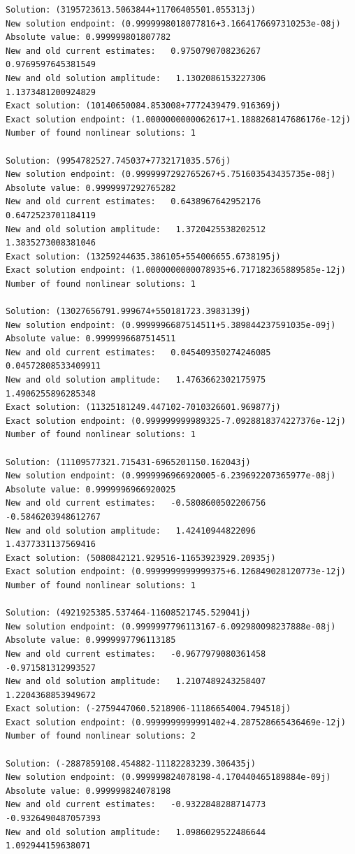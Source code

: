 \documentclass{article}
\begin{document}
\begin{verbatim}
Solution: (3195723613.5063844+11706405501.055313j)
New solution endpoint: (0.9999998018077816+3.1664176697310253e-08j) Absolute value: 0.999999801807782
New and old current estimates:   0.9750790708236267    0.9769597645381549
New and old solution amplitude:   1.1302086153227306    1.1373481200924829
Exact solution: (10140650084.853008+7772439479.916369j)
Exact solution endpoint: (1.0000000000062617+1.1888268147686176e-12j)
Number of found nonlinear solutions: 1

Solution: (9954782527.745037+7732171035.576j)
New solution endpoint: (0.9999997292765267+5.751603543435735e-08j) Absolute value: 0.9999997292765282
New and old current estimates:   0.6438967642952176    0.6472523701184119
New and old solution amplitude:   1.3720425538202512    1.3835273008381046
Exact solution: (13259244635.386105+554006655.6738195j)
Exact solution endpoint: (1.0000000000078935+6.717182365889585e-12j)
Number of found nonlinear solutions: 1

Solution: (13027656791.999674+550181723.3983139j)
New solution endpoint: (0.9999996687514511+5.389844237591035e-09j) Absolute value: 0.9999996687514511
New and old current estimates:   0.045409350274246085    0.04572808533409911
New and old solution amplitude:   1.4763662302175975    1.4906255896285348
Exact solution: (11325181249.447102-7010326601.969877j)
Exact solution endpoint: (0.999999999989325-7.0928818374227376e-12j)
Number of found nonlinear solutions: 1

Solution: (11109577321.715431-6965201150.162043j)
New solution endpoint: (0.9999996966920005-6.239692207365977e-08j) Absolute value: 0.9999996966920025
New and old current estimates:   -0.5808600502206756    -0.5846203948612767
New and old solution amplitude:   1.42410944822096    1.4377331137569416
Exact solution: (5080842121.929516-11653923929.20935j)
Exact solution endpoint: (0.9999999999999375+6.126849028120773e-12j)
Number of found nonlinear solutions: 1

Solution: (4921925385.537464-11608521745.529041j)
New solution endpoint: (0.9999997796113167-6.092980098237888e-08j) Absolute value: 0.9999997796113185
New and old current estimates:   -0.9677979080361458    -0.971581312993527
New and old solution amplitude:   1.2107489243258407    1.2204368853949672
Exact solution: (-2759447060.5218906-11186654004.794518j)
Exact solution endpoint: (0.9999999999991402+4.287528665436469e-12j)
Number of found nonlinear solutions: 2

Solution: (-2887859108.454882-11182283239.306435j)
New solution endpoint: (0.999999824078198-4.170440465189884e-09j) Absolute value: 0.999999824078198
New and old current estimates:   -0.9322848288714773    -0.9326490487057393
New and old solution amplitude:   1.0986029522486644    1.092944159638071


\end{verbatim}
\end{document}
